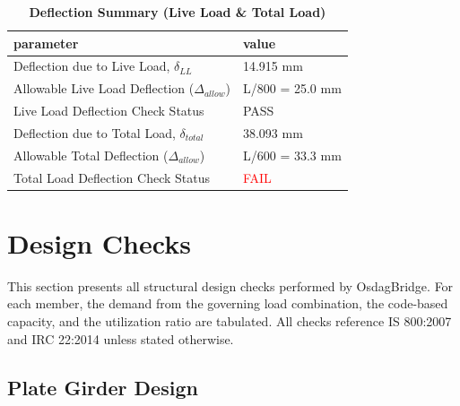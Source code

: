 \documentclass[12pt,a4paper]{report}
\numberwithin{table}{chapter}
\numberwithin{figure}{chapter}
\begin{document}
\vspace{1em}
\begin{longtable}{|L{7cm}|p{8.5cm}|}
\caption{\textbf{Deflection Summary (Live Load \& Total Load)}}
\hline
\textbf{parameter} & \textbf{value} \\
\hline
\textnormal{Deflection due to Live Load, $\delta_{LL}$} & 14.915 mm \\[6pt]
\hline
\textnormal{Allowable Live Load Deflection ($\Delta_{allow}$)} & L/800 = 25.0 mm \\[6pt]
\hline
\textnormal{Live Load Deflection Check Status} & PASS \\[6pt]
\hline
\textnormal{Deflection due to Total Load, $\delta_{total}$} & 38.093 mm \\[6pt]
\hline
\textnormal{Allowable Total Deflection ($\Delta_{allow}$)} & L/600 = 33.3 mm \\[6pt]
\hline
\textnormal{Total Load Deflection Check Status} & \textcolor{red}{FAIL} \\[6pt]
\hline
\end{longtable}

\vspace{1em}
\noindent
\noindent{}
\noindent{}
\noindent{}


\chapter{Design Checks}

This section presents all structural design checks performed by OsdagBridge. For each member, the demand from the governing load combination, the code-based capacity, and the utilization ratio are tabulated. All checks reference IS 800:2007 and IRC 22:2014 unless stated otherwise.

\section{Plate Girder Design}
\label{sec:plate-girder}
\end{document}
